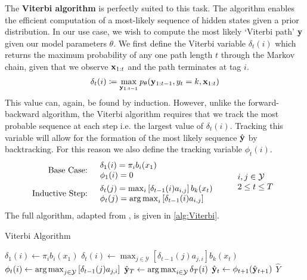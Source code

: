 \documentclass[../main.tex]{subfiles}
\begin{document}
The \textbf{Viterbi algorithm} \autocite{viterbi-1967} is perfectly suited to this task.
The algorithm enables the efficient computation of a most-likely sequence of hidden states given a prior distribution.
In our use case, we wish to compute the most likely `Viterbi path' $\mathbf{y}$ given our model parameters $\theta$.
We first define the Viterbi variable $\delta_t(i)$ which returns the maximum probability of any one path length $t$ through the Markov chain, given that we observe $\mathbf{x}_{1:t}$ and the path terminates at tag $i$.
\begin{equation*} \label{eq:viterbi-var}
    \delta_t(i) \coloneqq \max_{\mathbf{y}_{1:t-1}}p_\theta(\mathbf{y}_{1:t-1}, y_t = k, \mathbf{x}_{1:t})
\end{equation*}
This value can, again, be found by induction. However, unlike the forward-backward algorithm, the Viterbi algorithm requires that we track the most probable sequence at each step i.e. the largest value of $\delta_t(i)$.
Tracking this variable will allow for the formation of the most likely sequence $\hat{\mathbf{y}}$ by backtracking. For this reason we also define the tracking variable $\phi_t(i)$.
\begin{equation*}
    \begin{aligned}
        \text{Base Case:} & \quad \begin{array}{lr}
                                        \delta_1(i) = \pi_i b_i(x_1) \\
                                        \phi_1(i) = 0
                                    \end{array} \\
        \text{Inductive Step:} & \quad \begin{array}{lr}
                                            \delta_{t}(j) = \max_i \left[ \delta_{t-1}(i) a_{i,j} \right] b_k(x_t) \\
                                            \phi_t(j) = \operatorname*{arg\,max}_i \left[ \delta_{t-1}(i) a_{i,j} \right]
                                        \end{array}
    \end{aligned} \qquad 
        \begin{array}{lr}
            i,j \in \mathcal{Y} \\
            2 \leq t \leq T
        \end{array}
\end{equation*}
The full algorithm, adapted from \autocite{rabiner-1989-tutorial,eisenstein-nlp-2019}, is given in \cref{alg:Viterbi}.
\begin{algorithm}
\caption{Viterbi Algorithm} \label{alg:Viterbi}
\begin{algorithmic}
    \State $\delta_1(i) \gets \pi_i b_i(x_1)$
\EndFor
{}
    \State $\delta_t(i) \gets \max_{j \in \mathcal{Y}} \left[ \delta_{t-1}(j) a_{j,i} \right] b_k(x_t)$
    \State $\phi_t(i) \gets \operatorname*{arg\,max}_{j \in \mathcal{Y}} \left[ \delta_{t-1}(j) a_{j,i} \right]$
\EndFor
\EndFor
\State $\hat{\mathbf{y}}_T \gets \operatorname*{arg\,max}_{i \in \mathcal{Y}} \delta_T(i)$
    \State $\hat{\mathbf{y}}_t \gets \phi_{t+1}(\hat{\mathbf{y}}_{t+1})$
\EndFor
\State \Return $\hat{Y}$
\end{algorithmic}
\end{algorithm}
\end{document}
